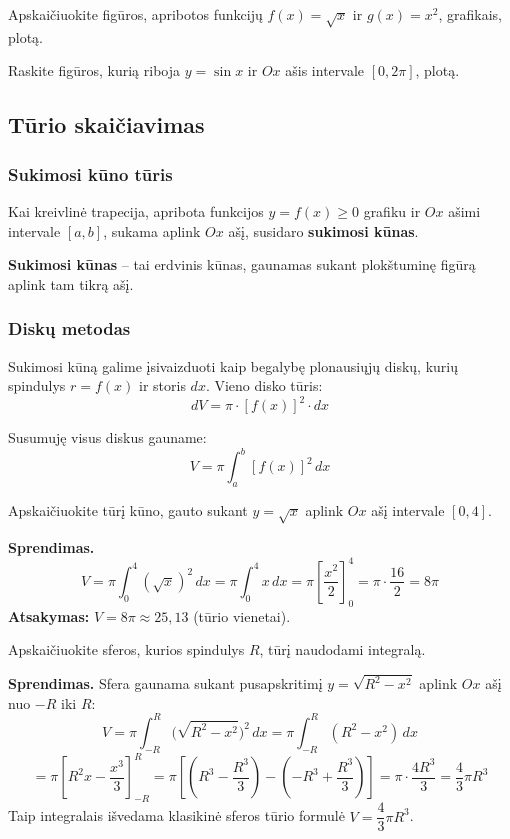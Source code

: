 \begin{exercise}
Apskaičiuokite figūros, apribotos funkcijų $f(x) = \sqrt{x}$ ir $g(x) = x^2$, grafikais, plotą.
\end{exercise}

\begin{exercise}
Raskite figūros, kurią riboja $y = \sin x$ ir $Ox$ ašis intervale $[0, 2\pi]$, plotą.
\end{exercise}


\subsection{Tūrio skaičiavimas}

\subsubsection{Sukimosi kūno tūris}

Kai kreivlinė trapecija, apribota funkcijos $y = f(x) \geq 0$ grafiku ir $Ox$ ašimi intervale $[a, b]$, sukama aplink $Ox$ ašį, susidaro \textbf{sukimosi kūnas}.

\begin{definition}
\textbf{Sukimosi kūnas} – tai erdvinis kūnas, gaunamas sukant plokštuminę figūrą aplink tam tikrą ašį.
\end{definition}

\subsubsection{Diskų metodas}

Sukimosi kūną galime įsivaizduoti kaip begalybę plonausiųjų diskų, kurių spindulys $r = f(x)$ ir storis $dx$. Vieno disko tūris:
\[
dV = \pi \cdot [f(x)]^2 \cdot dx
\]

Susumuję visus diskus gauname:
\[
\boxed{V = \pi \int_a^b [f(x)]^2\, dx}
\]

\begin{example}
Apskaičiuokite tūrį kūno, gauto sukant $y = \sqrt{x}$ aplink $Ox$ ašį intervale $[0, 4]$.

\textbf{Sprendimas.}
\[
V = \pi \int_0^4 (\sqrt{x})^2\, dx = \pi \int_0^4 x\, dx = \pi \left[\frac{x^2}{2}\right]_0^4 = \pi \cdot \frac{16}{2} = 8\pi
\]
\textbf{Atsakymas:} $V = 8\pi \approx 25{,}13$ (tūrio vienetai).
\end{example}

\begin{example}
Apskaičiuokite sferos, kurios spindulys $R$, tūrį naudodami integralą.

\textbf{Sprendimas.} Sfera gaunama sukant pusapskritimį $y = \sqrt{R^2 - x^2}$ aplink $Ox$ ašį nuo $-R$ iki $R$:
\[
V = \pi \int_{-R}^{R} \bigl(\sqrt{R^2 - x^2}\bigr)^2\, dx = \pi \int_{-R}^{R} (R^2 - x^2)\, dx
\]
\[
= \pi \left[R^2 x - \frac{x^3}{3}\right]_{-R}^{R} = \pi \left[\left(R^3 - \frac{R^3}{3}\right) - \left(-R^3 + \frac{R^3}{3}\right)\right]
= \pi \cdot \frac{4R^3}{3} = \frac{4}{3}\pi R^3
\]
Taip integralais išvedama klasikinė sferos tūrio formulė $V = \dfrac{4}{3}\pi R^3$.
\end{example}

